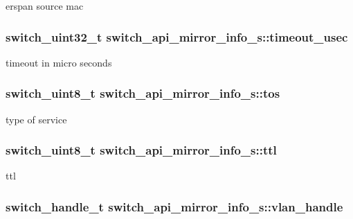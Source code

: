 erspan source mac \hypertarget{structswitch__api__mirror__info__s_a6068e1833b8c7f498be3cb44f27b46eb}{
\subsubsection[{timeout\+\_\+usec}]{\setlength{\rightskip}{0pt plus 5cm}switch\+\_\+uint32\+\_\+t switch\+\_\+api\+\_\+mirror\+\_\+info\+\_\+s\+::timeout\+\_\+usec}}\label{structswitch__api__mirror__info__s_a6068e1833b8c7f498be3cb44f27b46eb}
timeout in micro seconds \hypertarget{structswitch__api__mirror__info__s_a1d2704eb0f9a7c224c7d63c6fafa1206}{
\subsubsection[{tos}]{\setlength{\rightskip}{0pt plus 5cm}switch\+\_\+uint8\+\_\+t switch\+\_\+api\+\_\+mirror\+\_\+info\+\_\+s\+::tos}}\label{structswitch__api__mirror__info__s_a1d2704eb0f9a7c224c7d63c6fafa1206}
type of service \hypertarget{structswitch__api__mirror__info__s_aa9ee0d1fcf9ff4eba0ccbd7c8b619c43}{
\subsubsection[{ttl}]{\setlength{\rightskip}{0pt plus 5cm}switch\+\_\+uint8\+\_\+t switch\+\_\+api\+\_\+mirror\+\_\+info\+\_\+s\+::ttl}}\label{structswitch__api__mirror__info__s_aa9ee0d1fcf9ff4eba0ccbd7c8b619c43}
ttl \hypertarget{structswitch__api__mirror__info__s_a75e656875bcde00f5b3b05735f78aada}{
\subsubsection[{vlan\+\_\+handle}]{\setlength{\rightskip}{0pt plus 5cm}switch\+\_\+handle\+\_\+t switch\+\_\+api\+\_\+mirror\+\_\+info\+\_\+s\+::vlan\+\_\+handle}}\label{structswitch__api__mirror__info__s_a75e656875bcde00f5b3b05735f78aada}
